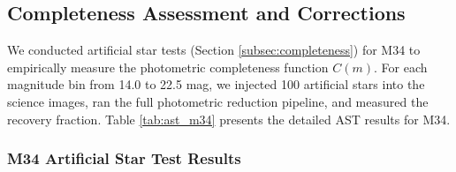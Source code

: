 \documentclass[linenumbers,trackchanges,twocolumn]{aastex701}
\begin{document}
\subsection{Completeness Assessment and Corrections} \label{subsec:results_completeness}

We conducted artificial star tests (Section \ref{subsec:completeness}) for M34 to empirically measure the photometric completeness function $C(m)$. For each magnitude bin from 14.0 to 22.5 mag, we injected 100 artificial stars into the science images, ran the full photometric reduction pipeline, and measured the recovery fraction. Table \ref{tab:ast_m34} presents the detailed AST results for M34.

\subsubsection{M34 Artificial Star Test Results}
\end{document}
